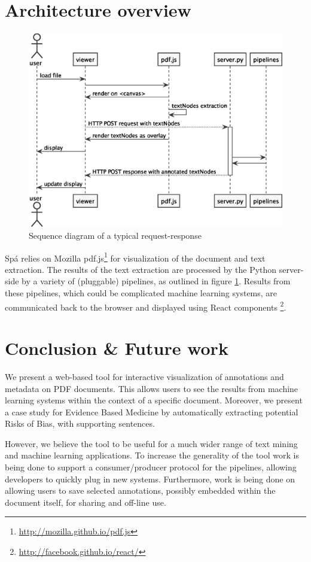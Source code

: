 \documentclass[runningheads,a4paper]{llncs}
\begin{document}
\section{Architecture overview}
\label{section:architecture}
\begin{figure}[htb]
\centering
\includegraphics[width=.9\linewidth]{./diagrams//sequence.eps}
\caption{\label{fig:sequence}Sequence diagram of a typical request-response}
\end{figure}
Spá relies on Mozilla pdf.js\footnote{\url{http://mozilla.github.io/pdf.js}} for visualization of the document and text extraction.
The results of the text extraction are processed by the Python server-side by a variety of (pluggable) pipelines, as outlined in figure \ref{fig:sequence}.
Results from these pipelines, which could be complicated machine learning systems, are communicated back to the browser and displayed using React components \footnote{\url{http://facebook.github.io/react/}}.

\section{Conclusion \& Future work}
We present a web-based tool for interactive visualization of annotations and metadata on PDF documents.
This allows users to see the results from machine learning systems within the context of a specific document.
Moreover, we present a case study for Evidence Based Medicine by automatically extracting potential Risks of Bias, with supporting sentences.

However, we believe the tool to be useful for a much wider range of text mining and machine learning applications.
To increase the generality of the tool work is being done to support a consumer/producer protocol for the pipelines, allowing developers to quickly plug in new systems.
Furthermore, work is being done on allowing users to save selected annotations, possibly embedded within the document itself, for sharing and off-line use.
\end{document}
